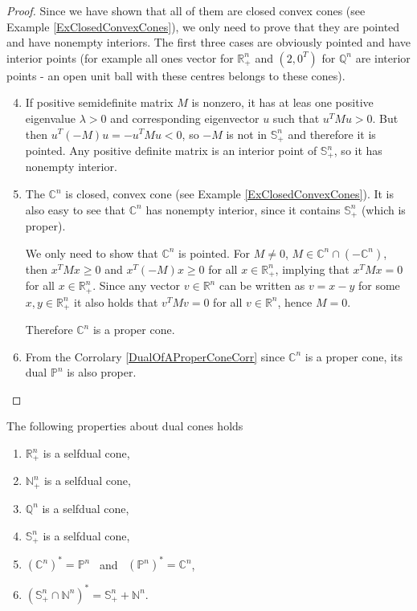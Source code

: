 \documentclass[12pt]{book}
\theoremstyle{definition}
\begin{document}
\begin{appendix}
\begin{proof} Since we have shown that all of them are closed convex cones (see Example \ref{ExClosedConvexCones}), we only need to prove that they are pointed and have nonempty interiors.
The first three cases are obviously pointed and have interior points (for example all ones vector for $\mathbb{R}^n_+$ and $(2,0^T)$ for $\mathbb{Q}^n$ are interior points - an open unit ball with these centres belongs to these cones). 
\begin{enumerate}
\setcounter{enumi}{3}
\item If positive semidefinite matrix $M$ is nonzero, it has at leas one positive eigenvalue $\lambda >0$ and corresponding eigenvector $u$ such that $u^TMu>0$. But then $u^T(-M)u = - u^TMu<0$, so $-M$ is not in $\mathbb{S}^n_+$ and therefore it is pointed. Any positive definite matrix is an interior point of $\mathbb{S}^n_+$, so it has nonempty interior. 

\item The $\mathbb{C}^n$ is closed, convex cone (see Example \ref{ExClosedConvexCones}). It is also easy to see that $\mathbb{C}^n$ has nonempty interior, since it contains $\mathbb{S}^n_+$ (which is proper).

We only need to show that $\mathbb{C}^n$ is pointed. For $M\neq 0$, $M\in\mathbb{C}^n\cap (-\mathbb{C}^n)$, 
then $x^TMx\geq 0$ and $x^T(-M)x\geq 0$ for all $x\in\mathbb{R}^n_+$, implying that 
$x^TMx=0$ for all $x\in\mathbb{R}^n_+$. Since any vector $v\in \mathbb{R}^n$ can be written as $v = x - y$ for some $x,y\in\mathbb{R}^n_+$ it also holds that $v^TMv=0$ for all $v\in\mathbb{R}^n$, hence $M=0$.

Therefore $\mathbb{C}^n$ is a proper cone. 

\item From the Corrolary \ref{DualOfAProperConeCorr} since $\mathbb{C}^n$ is a proper cone, its dual $\mathbb{P}^n$ is also proper.
\end{enumerate}
\end{proof}

 The following properties about dual cones holds
\label{ExDualCones}
\begin{enumerate}
\item $\mathbb{R}^n_+$ is a selfdual cone,
\item $\mathbb{N}^n_+$ is a selfdual cone,
\item $\mathbb{Q}^n$ is a selfdual cone,
\item $\mathbb{S}^n_+$ is a selfdual cone,
\item $(\mathbb{C}^n)^* = \mathbb{P}^{n}$ \ and \ $(\mathbb{P}^n)^* = \mathbb{C}^{n}$, 
\item $(\mathbb{S}^n_+\cap \mathbb{N}^n)^* = \mathbb{S}^n_+ + \mathbb{N}^n$.
\end{enumerate}


\end{appendix}
\end{document}
